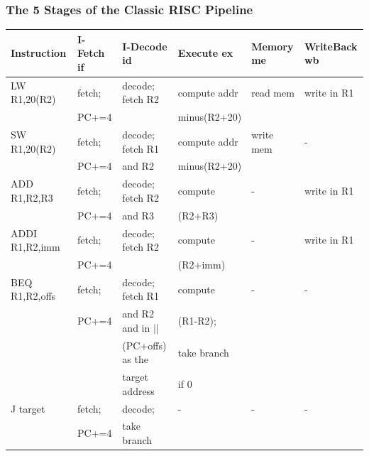 \documentclass{beamer}
\begin{document}
\begin{frame}[fragile,t]
\frametitle{The 5 Stages of the Classic RISC Pipeline}

\begin{tiny}
\begin{tabular}{llllll}
\hline
Instruction   & I-Fetch {\sc if} & I-Decode {\sc id} & Execute {\sc ex} & Memory {\sc me} & WriteBack {\sc wb} \\\hline
LW R1,20(R2)  & fetch;       & decode; fetch R2 & compute addr & read mem    & write in R1    \\
              & PC+=4        &                  & minus(R2+20) &             &                \\\hline
SW R1,20(R2)  & fetch;       & decode; fetch R1 & compute addr & write mem   & -              \\
              & PC+=4        & and R2           & minus(R2+20) &             &                \\\hline
ADD R1,R2,R3  & fetch;       & decode; fetch R2 & compute      & -           & write in R1    \\
              & PC+=4        & and R3           & (R2+R3)      &             &                \\\hline
ADDI R1,R2,imm& fetch;       & decode; fetch R2 & compute      & -           & write in R1    \\
              & PC+=4        &                  & (R2+imm)     &             &                \\\hline
BEQ R1,R2,offs& fetch;       & decode; fetch R1 & compute      & -           & -              \\
              & PC+=4        & and R2 and in $||$ & (R1-R2);     &             &                \\
              &              & (PC+offs) as the & take branch  &             &                \\
              &              & target address   & if 0         &             &                \\\hline
J target      & fetch;       & decode;          & -            & -           & -              \\
              & PC+=4        & take branch      &              &             &                \\\hline
\end{tabular}
\end{tiny} 


\end{frame}
\end{document}
